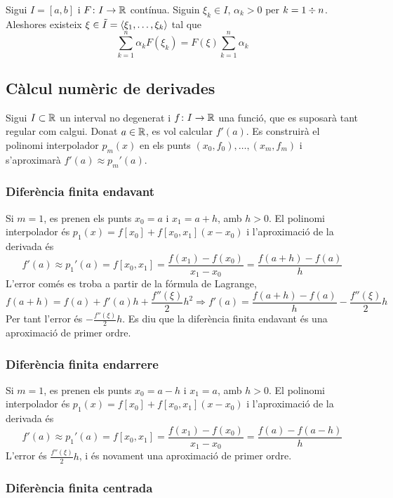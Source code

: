 \begin{lemma} \label{lemma:annexe_a}
	Sigui $I = [a, b]$ i $F \colon I \rightarrow \mathbb{R}$ contínua. Siguin $\xi_k \in I$, $\alpha_k > 0$ per $k = 1 \divisionsymbol n$. Aleshores existeix $\xi \in \tilde{I} = \langle \xi_1, \ldots, \xi_k \rangle$ tal que
	\[
		\sum_{k = 1}^n \alpha_k F(\xi_k) = F(\xi) \sum_{k=1}^n \alpha_k
	\]
\end{lemma}

\subsection{Càlcul numèric de derivades}

Sigui $I \subset \mathbb{R}$ un interval no degenerat i $f \colon I \rightarrow \mathbb{R}$ una funció, que es suposarà tant regular com calgui. Donat $a \in \mathbb{R}$, es vol calcular $f'(a)$. Es construirà el polinomi interpolador $p_m(x)$ en els punts $(x_0, f_0), \ldots, (x_m, f_m)$ i s'aproximarà $f'(a) \approx p_m'(a)$.

\subsubsection*{Diferència finita endavant}

Si $m = 1$, es prenen els punts $x_0 = a$ i $x_1 = a + h$, amb $h > 0$. El polinomi interpolador és $p_1(x) = f[x_0] + f[x_0,x_1](x - x_0)$ i l'aproximació de la derivada és 
\[
	f'(a) \approx 
	p_1'(a) = 
	f[x_0,x_1] = 
	\frac{f(x_1) - f(x_0)}{x_1 - x_0} = 
	\frac{f(a + h) - f(a)}{h}
\]
L'error comés es troba a partir de la fórmula de Lagrange,
\[
	f(a+h) = f(a) + f'(a) h + \frac{f''(\xi)}{2} h^2 \Longrightarrow
	f'(a) = \frac{f(a+h) - f(a)}{h} - \frac{f''(\xi)}{2} h
\]
Per tant l'error és $-\frac{f''(\xi)}{2} h$. Es diu que la diferència finita endavant és una aproximació de primer ordre.

\subsubsection*{Diferència finita endarrere}

Si $m = 1$, es prenen els punts $x_0 = a - h$ i $x_1 = a$, amb $h > 0$. El polinomi interpolador és $p_1(x) = f[x_0] + f[x_0,x_1](x - x_0)$ i l'aproximació de la derivada és 
\[
	f'(a) \approx 
	p_1'(a) = 
	f[x_0,x_1] = 
	\frac{f(x_1) - f(x_0)}{x_1 - x_0} = 
	\frac{f(a) - f(a-h)}{h}
\]
L'error és $\frac{f''(\xi)}{2} h$, i és novament una aproximació de primer ordre.

\subsubsection*{Diferència finita centrada}

